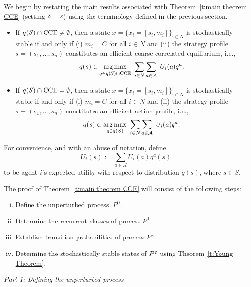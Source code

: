 We begin by restating the main results associated with Theorem~\ref{t:main theorem CCE} (setting $\delta = \varepsilon$) using the terminology defined in the previous section.  
%
\begin{itemize}%
%
\item If $q(S) \cap {\rm CCE} \neq \emptyset$, then a state $x=\{x_i = [s_i, m_i] \}_{i \in N}$ is stochastically stable if and only if (i) $m_i = C$ for all $i \in N$ and (ii) the strategy profile $s = (s_1, \dots, s_n)$ constitutes an efficient coarse correlated equilibrium, i.e., 
%
\begin{equation}\label{e:SS1}
q(s) \in \underset{ q \in q(S) \cap {\rm CCE}}{\arg \max} \ \sum_{i \in N} \sum_{a \in {\cal A}} \ U_i(a) q^a. 
\end{equation}
%
%
\item If $q(S) \cap {\rm CCE} = \emptyset$, then a state $x=\{x_i = [s_i, m_i] \}_{i \in N}$ is stochastically stable if and only if (i) $m_i = C$ for all $i \in N$ and (ii) the strategy profile $s = (s_1, \dots, s_n)$ constitutes an efficient action profile, i.e., 
%
\begin{equation}\label{e:SS2} 
q(s) \in \underset{ q \in q(S)}{\arg \max} \ \sum_{i \in N} \sum_{a \in {\cal A}} \ U_i(a) q^a. 
\end{equation} 
%
\end{itemize}

\noindent For convenience, and with an abuse of notation, define
\begin{equation}
U_i(s) := \sum_{a\in \mathcal{A}}U_i(a)q^a(s)
\end{equation}
to be agent $i$'s expected utility with respect to distribution $q(s)$, where $s\in S.$

The proof of Theorem~\ref{t:main theorem CCE} will consist of the following steps:
%
\begin{enumerate}[(i)]
\item Define the unperturbed process, $P^0$.
\item Determine the recurrent classes of process $P^0$.   
\item Establish transition probabilities of process $P^\varepsilon$.
\item Determine the stochastically stable states of $P^\varepsilon$ using Theorem~\ref{t:Young Theorem}.
\end{enumerate}

\vspace{.2cm}
\noindent \emph{Part 1:  Defining the unperturbed process}
\vspace{.2cm}

